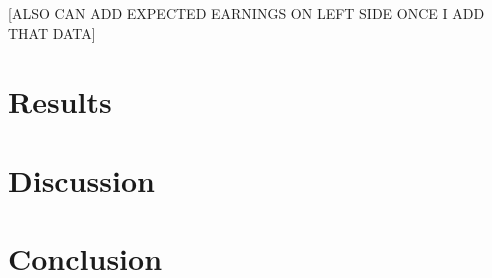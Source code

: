 \documentclass{article}
\begin{document}
	[ALSO CAN ADD EXPECTED EARNINGS ON LEFT SIDE ONCE I ADD THAT DATA]
	
	\section{Results}
	
	\blindtext
	
	\section{Discussion}
	
	\blindtext
	
	\section{Conclusion}
	
	\blindtext

	\printbibliography
	
\end{document}
